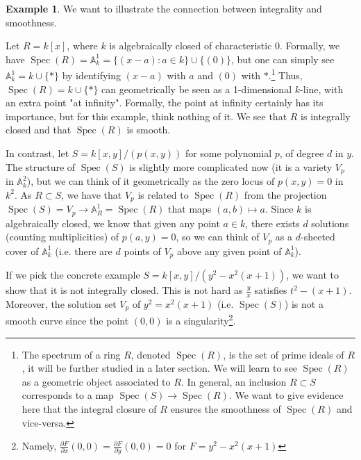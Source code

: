 \documentclass{tufte-handout} %
\theoremstyle{definition}
\newtheorem{exmp}[thm]{Example}
\theoremstyle{remark}
\newtheorem{rem}[thm]{Remark}
\DeclareMathOperator{\spec}{Spec}
\def \v {\vspace{0.2cm}}
\begin{document}

\begin{exmp}%
	We want to illustrate the connection between integrality and smoothness.
	
	Let $R = k[x]$, where $k$ is algebraically closed of characteristic $0$. Formally, we have $\spec(R) = \mathbb{A}_{k}^1 = \{(x - a) : a \in k\} \cup \{(0)\}$, but one can simply see $\mathbb{A}^1_k = k \cup \{*\}$ by identifying $(x-a)$ with $a$ and $(0)$ with $*$.\footnote{The spectrum of a ring $R$, denoted $\spec(R)$, is the set of prime ideals of $R$, it will be further studied in a later section. We will learn to see $\spec(R)$ as a geometric object associated to $R$. In general, an inclusion $R \subset S$ corresponds to a map $\spec(S) \rightarrow \spec(R)$. We want to give evidence here that the integral closure of $R$ ensures the smoothness of $\spec(R)$ and vice-versa.} Thus, $\spec(R) = k \cup \{*\}$ can geometrically be seen as a 1-dimensional $k$-line, with an extra point "at infinity". Formally, the point at infinity certainly has its importance, but for this example, think nothing of it. We see that $R$ is integrally closed and that $\spec(R)$ is smooth. \v
	
	In contrast, let $S = k[x, y]/(p(x,y))$ for some polynomial $p$, of degree $d$ in $y$. The structure of $\spec(S)$ is slightly more complicated now (it is a variety $V_p$ in $\mathbb{A}^2_k$), but we can think of it geometrically as the zero locus of $p(x,y) = 0$ in $k^2$. As $R \subset S$, we have that $V_p$ is related to $\spec(R)$ from the projection $\spec(S) = V_p \rightarrow \mathbb{A}_R^1 = \spec(R)$ that maps $(a,b) \mapsto a$. Since $k$ is algebraically closed, we know that given any point $a \in k$, there exists $d$ solutions (counting multiplicities) of $p(a, y) = 0$, so we can think of $V_p$ as a $d$-sheeted cover of $\mathbb{A}^1_k$ (i.e. there are $d$ points of $V_p$ above any given point of $\mathbb{A}^1_k$). \v
	
	If we pick the concrete example $S = k[x,y]/(y^2-x^2(x+1))$, we want to show that it is not integrally closed. This is not hard as $\frac{y}{x}$ satisfies $t^2 - (x+1)$. Moreover, the solution set $V_p$ of $y^2 = x^2(x+1)$ (i.e. $\spec(S)$) is not a smooth curve since the point $(0,0)$ is a singularity\footnote{Namely, $\frac{\partial F}{\partial x}(0,0) = \frac{\partial F}{\partial y}(0,0) = 0$ for $F = y^2 - x^2(x+1)$}. \v
	

\end{exmp}
\end{document}
